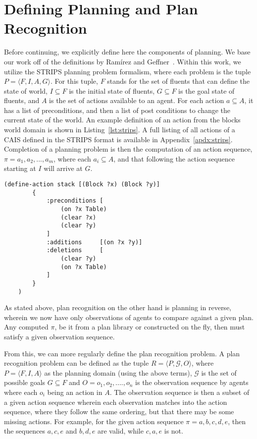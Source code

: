 \section{Defining Planning and Plan Recognition}

Before continuing, we explicitly define here the components of planning. We base our
work off of the definitions by Ramírez and Geffner~\cite{ramirez_plan_2009}.
Within this work, we utilize the STRIPS planning problem formalism, where each problem is the
tuple $P = \langle F, I, A, G \rangle$. For this tuple, $F$ stands for the set of
fluents that can define the state of world, $I \subseteq F$ is the initial state of
fluents, $G \subseteq F$ is the goal state of fluents, and $A$ is the set of actions
available to an agent. For each action $a \subseteq A$, it has a list
of preconditions, and then a list of post conditions to change the current
state of the world. An example definition of an action from the blocks world domain is shown
in Listing~\ref{lst:strips}. A full listing of all actions of a CAIS defined in the STRIPS format
is available in Appendix~\ref{apdx:strips}. Completion of a planning problem is then the computation of
an action sequence, $\pi = a_{1}, a_{2}, ..., a_{m}$, where each
$a_{i} \subseteq A$, and that following the action sequence starting at $I$
will arrive at $G$.

\begin{lstlisting}[caption=Stack action defined in STRIPS style,label={lst:strips}]
    (define-action stack [(Block ?x) (Block ?y)]
        {
            :preconditions [
                (on ?x Table)
                (clear ?x)
                (clear ?y)
            ]
            :additions     [(on ?x ?y)]
            :deletions     [
                (clear ?y)
                (on ?x Table)
            ]
        }
    )
\end{lstlisting}

As stated above, plan recognition on the other hand is planning in reverse,
wherein we now have only observations of agents to compare against a given plan.
Any computed $\pi$, be it from a plan library or constructed on the fly, then
must satisfy a given observation sequence.

From this, we can more regularly define the plan recognition problem. A plan recognition
problem can be defined as the tuple $R = \langle P, \mathcal{G}, O \rangle$, where
$P = \langle F, I, A \rangle$ as the planning domain (using the above terms),
$\mathcal{G}$ is the set of possible goals $G \subseteq F$ and
$O = o_{1}, o_{2}, ...., o_{n}$ is the observation sequence by agents where each
$o_{i}$ being an action in $A$. The observation sequence is then a subset
of a given action sequence wherein each observation matches into the action
sequence, where they follow the same ordering, but that there may be some missing
actions. For example, for the given action sequence $\pi = {a,b,c,d,e}$, then
the sequences ${a,c,e}$ and ${b,d,e}$ are valid, while ${c,a,e}$ is not.
